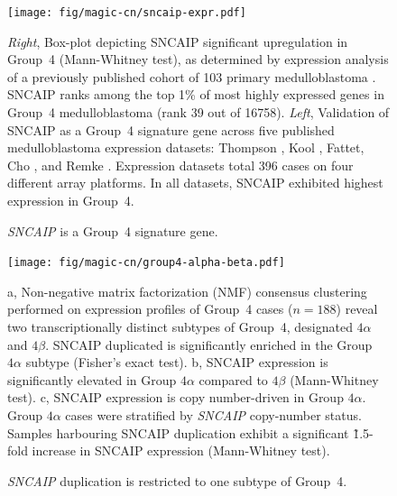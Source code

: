 \documentclass[11pt,letterpaper]{article}
\theoremstyle{definition}
\begin{document}

\begin{figure}[h]
	\begin{center}
		\texttt{[image: fig/magic-cn/sncaip-expr.pdf]}
	\end{center}
	\caption{\emph{SNCAIP} is a Group~4 signature gene.}
	\emph{Right}, Box-plot depicting SNCAIP significant upregulation in Group~4 (Mann-Whitney test), as determined by expression analysis of a previously published cohort of 103 primary medulloblastoma . SNCAIP ranks among the top 1\% of most highly expressed genes in Group~4 medulloblastoma (rank 39 out of 16758).
	\emph{Left}, Validation of SNCAIP as a Group~4 signature gene across five published medulloblastoma expression datasets: Thompson , Kool , Fattet, Cho , and Remke . Expression datasets total 396 cases on four different array platforms. In all datasets, SNCAIP exhibited highest expression in Group~4.
	\label{fig:sncaip-expr}
\end{figure}

\begin{figure}[h]
	\begin{center}
		\texttt{[image: fig/magic-cn/group4-alpha-beta.pdf]}
	\end{center}
	\caption{\emph{SNCAIP} duplication is restricted to one subtype of Group~4.}
	\textsf{a}, Non-negative matrix factorization (NMF) consensus clustering performed on expression profiles of Group~4 cases ($n = 188$) reveal two transcriptionally distinct subtypes of Group~4, designated $4\alpha$ and $4\beta$. SNCAIP duplicated is significantly enriched in the Group $4\alpha$ subtype (Fisher's exact test).
	\textsf{b}, SNCAIP expression is significantly elevated in Group $4\alpha$ compared to $4\beta$ (Mann-Whitney test).
	\textsf{c}, SNCAIP expression is copy number-driven in Group $4\alpha$. Group $4\alpha$ cases were stratified by \emph{SNCAIP} copy-number status. Samples harbouring SNCAIP duplication exhibit a significant \~1.5-fold increase in SNCAIP expression (Mann-Whitney test).
	\label{fig:group4-alpha-beta}
\end{figure}

\clearpage
\end{document}
